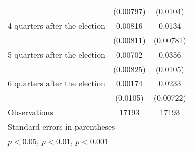 \begin{table}[htbp]
\begin{tabular}{l*{2}{c}}
                    &   (0.00797)         &    (0.0104)         \\
[1em]
 4 quarters after the election&     0.00816         &      0.0134         \\
                    &   (0.00811)         &   (0.00781)         \\
[1em]
 5 quarters after the election&     0.00702         &      0.0356\sym{***}\\
                    &   (0.00825)         &    (0.0105)         \\
[1em]
 6 quarters after the election&     0.00174         &      0.0233\sym{**} \\
                    &    (0.0105)         &   (0.00722)         \\
\hline
Observations        &       17193         &       17193         \\
\hline\hline
\multicolumn{3}{l}{\footnotesize Standard errors in parentheses}\\
\multicolumn{3}{l}{\footnotesize \sym{*} \(p<0.05\), \sym{**} \(p<0.01\), \sym{***} \(p<0.001\)}\\
\end{tabular}
\end{table}
